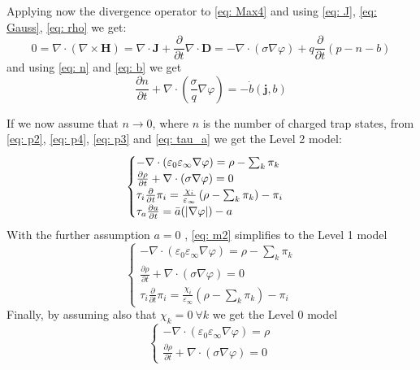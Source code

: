 \documentclass{Configuration_Files/PoliMi3i_thesis}
\let\phi\varphi
\let\epsilon\varepsilon
\begin{document}
Applying now the divergence operator to \ref{eq: Max4} and using \ref{eq: J}, \ref{eq: Gauss}, \ref{eq: rho} we get:
\begin{equation}
    \label{eq: p4}
    0=\nabla\cdot(\nabla\times\bm{H})=\nabla\cdot\bm{J}+\frac{\partial }{\partial t}\nabla \cdot \bm{D}= -\nabla\cdot(\sigma\nabla\phi)+q\frac{\partial}{\partial t}(p-n-b)
\end{equation}
and using \ref{eq: n} and \ref{eq: b} we get
\begin{equation}
    \label{eq: p5}
    \frac{\partial n}{\partial t}+\nabla\cdot\left(\frac{\sigma}{q}\nabla\phi\right)=-\Dot{b}(\bm{j},b)
\end{equation}

If we now assume that $n\rightarrow 0$, where $n$ is the number of charged trap states, from \ref{eq: p2}, \ref{eq: p4}, \ref{eq: p3} and \ref{eq: tau_a} we get the Level 2 model:
\begin{equation}
    \begin{cases}
    -\nabla\cdot(\epsilon_0\epsilon_\infty\nabla\phi) =\rho-\sum_k\pi_k\\
    \frac{\partial \rho}{\partial t}+\nabla\cdot(\sigma\nabla\phi)=0\\
     \tau_i\frac{\partial}{\partial t}\pi_i= \frac{\chi_i} {\epsilon_\infty} \left(\rho-\sum_k\pi_k\right)-\pi_i\\ \tau_a\frac{\partial a}{\partial t} = \Bar{a}(|\nabla\phi|)-a
    \end{cases}
    \label{eq: m2}
\end{equation}
With the further assumption $a=0$ , \ref{eq: m2} simplifies to the Level 1 model
\begin{equation}
    \begin{cases}
    -\nabla\cdot(\epsilon_0\epsilon_\infty\nabla\phi) =\rho-\sum_k\pi_k\\
    \frac{\partial \rho}{\partial t}+\nabla\cdot(\sigma\nabla\phi)=0\\
     \tau_i\frac{\partial}{\partial t}\pi_i= \frac{\chi_i} {\epsilon_\infty} \left(\rho-\sum_k\pi_k\right)-\pi_i
    \end{cases}
    \label{eq: m1}
\end{equation}
Finally, by assuming also that $\chi_k=0\ \forall k$ we get the Level 0 model
\begin{equation}
    \begin{cases}
    -\nabla\cdot(\epsilon_0\epsilon_\infty\nabla\phi) =\rho\\
    \frac{\partial \rho}{\partial t}+\nabla\cdot(\sigma\nabla\phi)=0
    \end{cases}
    \label{eq: m0}
\end{equation}
\end{document}
